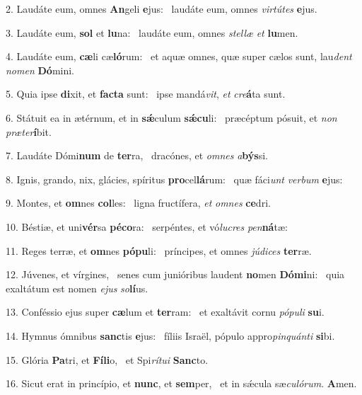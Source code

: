 2. Laudáte eum, omnes \textbf{An}geli \textbf{e}jus: \ast\  laudáte eum, omnes \textit{vir}\textit{tú}\textit{tes} \textbf{e}jus.\

3. Laudáte eum, \textbf{sol} et \textbf{lu}na: \ast\  laudáte eum, omnes \textit{stel}\textit{læ} \textit{et} \textbf{lu}men.\

4. Laudáte eum, \textbf{cæ}li cæ\textbf{ló}rum: \ast\  et aquæ omnes, quæ super cælos sunt, lau\textit{dent} \textit{no}\textit{men} \textbf{Dó}mini.\

5. Quia ipse \textbf{di}xit, et \textbf{fac}\textbf{ta} sunt: \ast\  ipse mandá\textit{vit}, \textit{et} \textit{cre}\textbf{á}ta sunt.\

6. Státuit ea in ætérnum, et in \textbf{sǽ}culum \textbf{sǽ}\textbf{cu}li: \ast\  præcéptum pósuit, et \textit{non} \textit{præ}\textit{ter}\textbf{í}bit.\

7. Laudáte Dómi\textbf{num} de \textbf{ter}ra, \ast\  dracónes, et \textit{om}\textit{nes} \textit{a}\textbf{býs}si.\

8. Ignis, grando, nix, glácies, spíritus \textbf{pro}cel\textbf{lá}rum: \ast\  quæ fáci\textit{unt} \textit{ver}\textit{bum} \textbf{e}jus:\

9. Montes, et \textbf{om}nes \textbf{col}les: \ast\  ligna fructífera, \textit{et} \textit{om}\textit{nes} \textbf{ce}dri.\

10. Béstiæ, et uni\textbf{vér}sa \textbf{pé}\textbf{co}ra: \ast\  serpéntes, et vó\textit{lu}\textit{cres} \textit{pen}\textbf{ná}tæ:\

11. Reges terræ, et \textbf{om}nes \textbf{pó}\textbf{pu}li: \ast\  príncipes, et omnes \textit{jú}\textit{di}\textit{ces} \textbf{ter}ræ.\

12. Júvenes, et vírgines, \dag\  senes cum junióribus laudent \textbf{no}men \textbf{Dó}\textbf{mi}ni: \ast\  quia exaltátum est nomen \textit{e}\textit{jus} \textit{so}\textbf{lí}us.\

13. Conféssio ejus super \textbf{cæ}lum et \textbf{ter}ram: \ast\  et exaltávit cornu \textit{pó}\textit{pu}\textit{li} \textbf{su}i.\

14. Hymnus ómnibus \textbf{sanc}tis \textbf{e}jus: \ast\  fíliis Israël, pópulo appro\textit{pin}\textit{quán}\textit{ti} \textbf{si}bi.\

15. Glória \textbf{Pa}tri, et \textbf{Fí}\textbf{li}o, \ast\  et Spi\textit{rí}\textit{tu}\textit{i} \textbf{Sanc}to.\

16. Sicut erat in princípio, et \textbf{nunc}, et \textbf{sem}per, \ast\  et in sǽcula sæ\textit{cu}\textit{ló}\textit{rum}. \textbf{A}men.\

